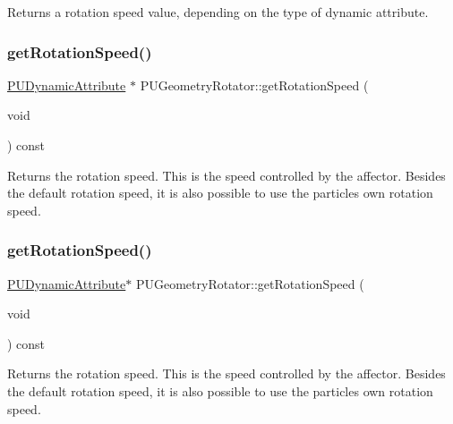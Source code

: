 Returns a rotation speed value, depending on the type of dynamic attribute. \mbox{\label{classPUGeometryRotator_a9872dd18f2cb178f58b2251b9a81cd77}} 
\subsubsection{\texorpdfstring{get\+Rotation\+Speed()}{getRotationSpeed()}\hspace{0.1cm}{\footnotesize\ttfamily [1/2]}}
{\footnotesize\ttfamily \hyperlink{classPUDynamicAttribute}{P\+U\+Dynamic\+Attribute} $\ast$ P\+U\+Geometry\+Rotator\+::get\+Rotation\+Speed (\begin{DoxyParamCaption}\item[{void}]{ }\end{DoxyParamCaption}) const}

Returns the rotation speed. This is the speed controlled by the affector. Besides the default rotation speed, it is also possible to use the particles own rotation speed. \mbox{\label{classPUGeometryRotator_a3e3851880f0707845466410294b4506e}} 
\subsubsection{\texorpdfstring{get\+Rotation\+Speed()}{getRotationSpeed()}\hspace{0.1cm}{\footnotesize\ttfamily [2/2]}}
{\footnotesize\ttfamily \hyperlink{classPUDynamicAttribute}{P\+U\+Dynamic\+Attribute}$\ast$ P\+U\+Geometry\+Rotator\+::get\+Rotation\+Speed (\begin{DoxyParamCaption}\item[{void}]{ }\end{DoxyParamCaption}) const}

Returns the rotation speed. This is the speed controlled by the affector. Besides the default rotation speed, it is also possible to use the particles own rotation speed. \mbox{\label{classPUGeometryRotator_a552415ef8f78fd912c7c889119511aef}} 
